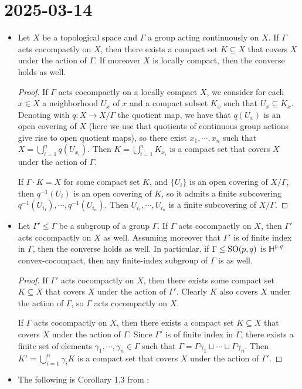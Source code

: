 \documentclass{report}
\begin{document}
\section{2025-03-14}
\begin{itemize}
    \item Let $X$ be a topological space and $\Gamma$ a group acting continuously on $X$. If $\Gamma$ acts cocompactly on $X$, then there exists a compact set $K \subseteq X$ that covers $X$ under the action of $\Gamma$. If moreover $X$ is locally compact, then the converse holds as well.
    \begin{proof}
        If $\Gamma$ acts cocompactly on a locally compact $X$, we consider for each $x \in X$ a neighborhood $U_x$ of $x$ and a compact subset $K_x$ such that $U_x \subseteq K_x$.
        Denoting with $q: X \to X/\Gamma$ the quotient map, we have that $q(U_x)$ is an open covering of $X$ (here we use that quotients of continuous group actions give rise to open quotient maps), so there exist $x_1, \cdots, x_n$ such that $X = \bigcup_{i=1}^n q(U_{x_i})$.
        Then $K = \bigcup_{i=1}^n K_{x_i}$ is a compact set that covers $X$ under the action of $\Gamma$.
        
        If $\Gamma \cdot K = X$ for some compact set $K$, and $\{U_i\}$ is an open covering of $X/\Gamma$, then $q^{-1}(U_i)$ is an open covering of $K$, so it admits a finite subcovering $q^{-1}(U_{i_1}), \cdots, q^{-1}(U_{i_n})$.
        Then $U_{i_1}, \cdots, U_{i_n}$ is a finite subcovering of $X/\Gamma$.
    \end{proof}
    \item Let $\Gamma' \leq \Gamma$ be a subgroup of a group $\Gamma$.
    If $\Gamma$ acts cocompactly on $X$, then $\Gamma'$ acts cocompactly on $X$ as well.
    Assuming moreover that $\Gamma'$ is of finite index in $\Gamma$, then the converse holds as well.
    In particular, if $\Gamma \leq \operatorname{{\mathrm{SO}}}(p,q)$ is $\mathbb H^{p,q}$ convex-cocompact, then any finite-index subgroup of $\Gamma$ is as well.
    \begin{proof}
        If $\Gamma'$ acts cocompactly on $X$, then there exists some compact set $K \subseteq X$ that covers $X$ under the action of $\Gamma'$.
        Clearly $K$ also covers $X$ under the action of $\Gamma$, so $\Gamma$ acts cocompactly on $X$.

        If $\Gamma$ acts cocompactly on $X$, then there exists a compact set $K \subseteq X$ that covers $X$ under the action of $\Gamma$.
        Since $\Gamma'$ is of finite index in $\Gamma$, there exists a finite set of elements $\gamma_1, \cdots, \gamma_n \in \Gamma$ such that $\Gamma = \Gamma \gamma_1 \sqcup \cdots \sqcup \Gamma \gamma_n$.
        Then $K' = \bigcup_{i=1}^n \gamma_i K$ is a compact set that covers $X$ under the action of $\Gamma'$.
    \end{proof}
    \item The following is Corollary 1.3 from \cite{guichard2012anosov}:
    

\end{itemize}
\end{document}
